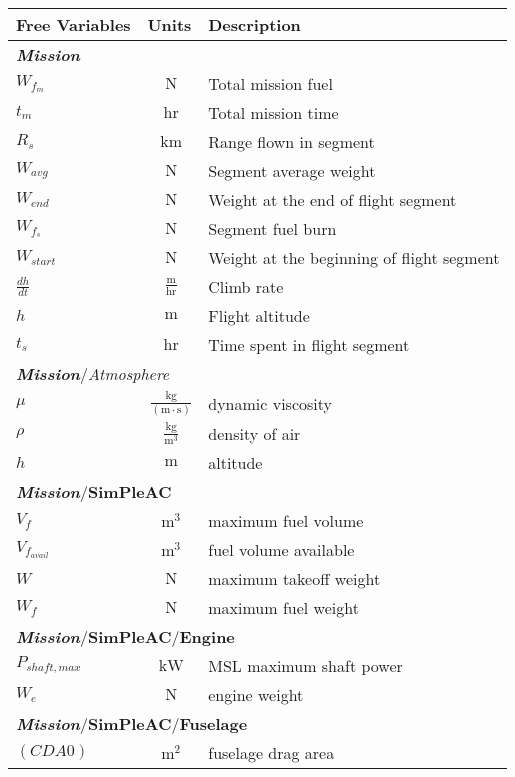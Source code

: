 {\footnotesize
\begin{longtable}{lcl}
\toprule
Free Variables & Units & Description \\ \midrule
\multicolumn{3}{l}{\textbf{\textit{Mission}}} \\
$W_{f_{m}}$ & $~\mathrm{N}$ & Total mission fuel \\
$t_m$ & $~\mathrm{hr}$ & Total mission time \\
$R_s$ & $~\mathrm{km}$ & Range flown in segment \\
$W_{avg}$ & $~\mathrm{N}$ & Segment average weight \\
$W_{end}$ & $~\mathrm{N}$ & Weight at the end of flight segment \\
$W_{f_s}$ & $~\mathrm{N}$ & Segment fuel burn \\
$W_{start}$ & $~\mathrm{N}$ & Weight at the beginning of flight segment \\
$\frac{dh}{dt}$ & $~\mathrm{\tfrac{m}{hr}}$ & Climb rate \\
$h$ & $~\mathrm{m}$ & Flight altitude \\
$t_s$ & $~\mathrm{hr}$ & Time spent in flight segment \\
\hline
\multicolumn{3}{l}{\textbf{\textit{Mission}}/\textit{Atmosphere}} \\
$\mu$ & $~\mathrm{\tfrac{kg}{\left(m\cdot s\right)}}$ & dynamic viscosity \\
$\rho$ & $~\mathrm{\tfrac{kg}{m^{3}}}$ & density of air \\
$h$ & $~\mathrm{m}$ & altitude \\
\hline
\multicolumn{3}{l}{\textbf{\textit{Mission}}/\textbf{SimPleAC}} \\
$V_f$ & $~\mathrm{m^{3}}$ & maximum fuel volume \\
$V_{f_{avail}}$ & $~\mathrm{m^{3}}$ & fuel volume available \\
$W$ & $~\mathrm{N}$ & maximum takeoff weight \\
$W_f$ & $~\mathrm{N}$ & maximum fuel weight \\
\hline
\multicolumn{3}{l}{\textbf{\textit{Mission}}/\textbf{SimPleAC}/\textbf{Engine}} \\
$P_{shaft,max}$ & $~\mathrm{kW}$ & MSL maximum shaft power \\
$W_e$ & $~\mathrm{N}$ & engine weight \\
\hline
\multicolumn{3}{l}{\textbf{\textit{Mission}}/\textbf{SimPleAC}/\textbf{Fuselage}} \\
$(CDA0)$ & $~\mathrm{m^{2}}$ & fuselage drag area \\

\end{longtable}}
